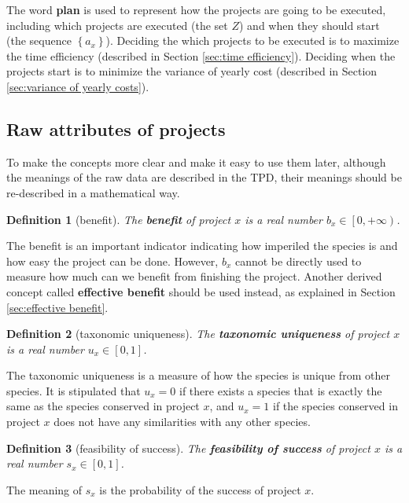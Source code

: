 \documentclass{article}
\newtheorem{definition}{Definition}
\begin{document}
The word \textbf{plan} is used to represent how the projects are going to be executed,
including which projects are executed (the set $Z$) and when they should start (the sequence $\left\{a_x\right\}$).
Deciding the which projects to be executed is to maximize the time efficiency (described in Section \ref{sec:time efficiency}).
Deciding when the projects start is to minimize the variance of yearly cost (described in Section \ref{sec:variance of yearly costs}).

\subsection{Raw attributes of projects}
\label{sec:raw attributes}

To make the concepts more clear and make it easy to use them later,
although the meanings of the raw data are described in the TPD,
their meanings should be re-described in a mathematical way.

\begin{definition}[benefit]
The \textbf{benefit} of project $x$ is a real number $b_x\in\left[0,+\infty\right)$.
\end{definition}

The benefit is an important indicator indicating how imperiled the species is and how easy the project can be done.
However, $b_x$ cannot be directly used to measure how much can we benefit from finishing the project.
Another derived concept called \textbf{effective benefit} should be used instead, as explained in Section \ref{sec:effective benefit}.

\begin{definition}[taxonomic uniqueness]
The \textbf{taxonomic uniqueness} of project $x$ is a real number $u_x\in\left[0,1\right]$.
\end{definition}

The taxonomic uniqueness is a measure of how the species is unique from other species.
It is stipulated that $u_x=0$ if there exists a species that is exactly the same as the species conserved in project $x$,
and $u_x=1$ if the species conserved in project $x$ does not have any similarities with any other species.

\begin{definition}[feasibility of success]
The \textbf{feasibility of success} of project $x$ is a real number $s_x\in\left[0,1\right]$.
\end{definition}

The meaning of $s_x$ is the probability of the success of project $x$.
\end{document}
